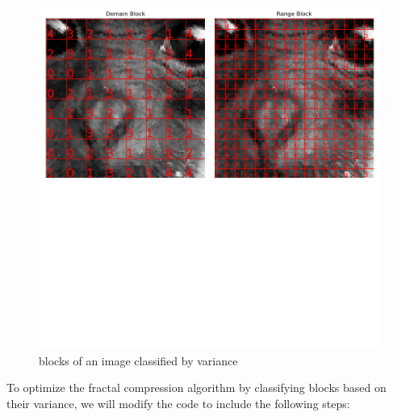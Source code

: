 \documentclass[a4paper,11pt, titlepage]{article}
\theoremstyle{definition}
\theoremstyle{plain}
\theoremstyle{remark}
\theoremstyle{definition}
\begin{document}
\begin{figure}[H]
    \centering
    \includegraphics[width=\textwidth, trim=0 350 0 0,clip]{classification.png}
    \caption{blocks of an image classified by variance}
    \label{fig:classification}
\end{figure}

To optimize the fractal compression algorithm by classifying blocks based on their variance, we will modify the code to include the following steps:
\end{document}
